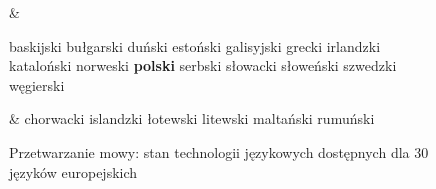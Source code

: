 \begin{figure}[t]
\begin{tabular}
& \vspace*{0.5mm}


baskijski\newline
bułgarski\newline
duński\newline
estoński\newline
galisyjski\newline
grecki\newline
irlandzki\newline
kataloński\newline
norweski\newline
\textbf{polski}\newline
serbski\newline
słowacki\newline
słoweński\newline
szwedzki\newline
węgierski\newline


& \vspace*{0.5mm}
chorwacki \newline 
islandzki \newline  
łotewski \newline 
litewski \newline 
maltański \newline 
rumuński\\
\end{tabular}
\caption{Przetwarzanie mowy: stan technologii językowych dostępnych dla 30 języków europejskich}
\label{fig:speech_cluster_pl}
\end{figure}


